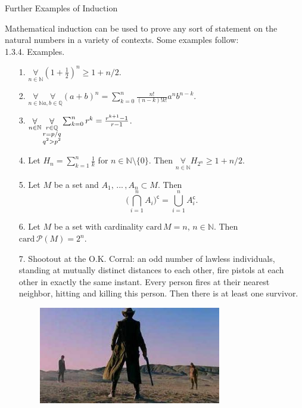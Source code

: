 \documentclass[smaller,hyperref={CJKbookmarks=true}]{beamer}
\newcommand{\N}{\mathbb{N}} \newcommand{\Z}{\mathbb{Z}} \newcommand{\Q}{\mathbb{Q}}
\begin{document}
\begin{frame}{Further Examples of Induction}
\begin{spacing}{0.9}
Mathematical induction can be used to prove any sort of statement on the
natural numbers in a variety of contexts. Some examples follow:\\[5pt]
\alert{1.3.4. Examples.}
\begin{itemize}
  \item[1.] $\mathop{\forall}\limits_{n\in\N}(1+\frac{1}{2})^n\geq1+n/2.$
  \item[2.] $\mathop{\forall}\limits_{n\in\N}\mathop{\forall}\limits_{a,b\in\Q}
      (a+b)^n=\sum_{k=0}^{n}\frac{n!}{(n-k)!k!}a^nb^{n-k}.$
  \item[3.] $\mathop{\forall}\limits_{n\in\N}\mathop{\forall}\limits_{\begin{subarray}{c}
                                                    r\in\Q\\
                                                    r=p/q\\
                                                    q^2>p^2
                                                  \end{subarray}}\sum_{k=0}^{n}r^k=\frac{r^{k+1}-1}{r-1}$.
  \item[4.] Let $H_n=\sum\limits_{k=1}^n\frac{1}{k}$ for $n\in\N\setminus\{0\}$. Then $\mathop{\forall}\limits_{n\in\N}H_{2^n}\geq1+n/2$.
  \item[5.] Let $M$ be a set and $A_1,\,...\,,A_n\subset M$. Then
      \[\Big(\bigcap_{i=1}^nA_i\Big)^{\mathsf{c}}=\bigcup_{i=1}^nA_i^{\mathsf{c}}.\]
\end{itemize}
\end{spacing}
\begin{spacing}{1.1}
\newpage
\begin{itemize}
  \item[6.] Let $M$ be a set with cardinality $\text{card}\,M=n,\,n\in\N$. Then $\text{card}\,\mathcal{P}(M)=2^n$.
  \item[7.] Shootout at the O.K. Corral: an odd number of lawless individuals,
      standing at mutually distinct distances to each other, fire pistols at
      each other in exactly the same instant. Every person fires at their
      nearest neighbor, hitting and killing this person. Then there is at least
      one survivor.
\end{itemize}
\begin{figure}
  \centering
  \includegraphics[width=0.8\textwidth,height=120pt]{corral.jpg}
\end{figure}
\end{spacing}
\end{frame}
\end{document}
